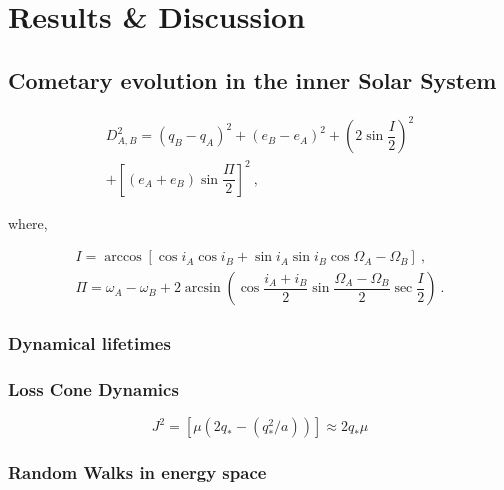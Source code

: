 \chapter{Results \& Discussion}
\label{chap:results}

\section{Cometary evolution in the inner Solar System}

\begin{equation}
\begin{split}
    D_{A,B}^2 = (q_B - q_A)^2 + (e_B - e_A)^2 + \left(2\sin{\dfrac{I}{2}}\right)^2
    \\ + \left[(e_A + e_B)\sin{\dfrac{\Pi}{2}}\right]^2 ~,
\end{split}
\end{equation}

where,

\begin{equation}
\begin{split}
    I = \arccos[{\cos{i_A}\cos{i_B}+\sin{i_A}\sin{i_B}\cos{\Omega_A-\Omega_B}}]~,\\
    \Pi = \omega_A - \omega_B + 2\arcsin{\left(\cos{\dfrac{i_A + i_B}{2}\sin{\dfrac{\Omega_A - \Omega_B}{2}\sec{\dfrac{I}{2}}}}{}\right)}~.
\end{split}
\end{equation}

\subsection{Dynamical lifetimes}

\subsection{Loss Cone Dynamics}

\begin{equation}
    J^2 = [\mu(2q_* - (q_*^2/a))] \approx 2q_*\mu
\end{equation}

\subsection{Random Walks in energy space}

